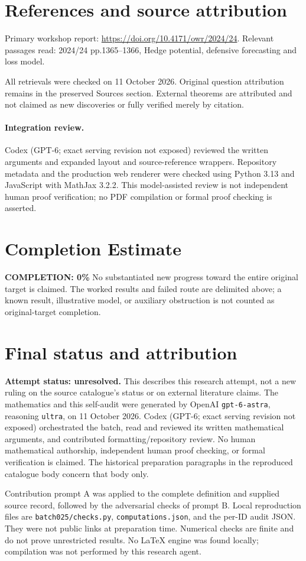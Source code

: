 \documentclass[11pt]{article}
\begin{document}
\section{References and source attribution}
Primary workshop report: \url{https://doi.org/10.4171/owr/2024/24}. Relevant passages read: 2024/24 pp.1365--1366, Hedge potential, defensive forecasting and loss model.

All retrievals were checked on 11 October 2026. Original question attribution remains in the preserved Sources section. External theorems are attributed and not claimed as new discoveries or fully verified merely by citation.


\paragraph{Integration review.} Codex (GPT-6; exact serving revision not exposed) reviewed the written arguments and expanded layout and source-reference wrappers. Repository metadata and the production web renderer were checked using Python 3.13 and JavaScript with MathJax 3.2.2. This model-assisted review is not independent human proof verification; no PDF compilation or formal proof checking is asserted.

\section{Completion Estimate}
\noindent\textbf{COMPLETION: 0\%}
No substantiated new progress toward the entire original target is claimed. The worked results and failed route are delimited above; a known result, illustrative model, or auxiliary obstruction is not counted as original-target completion.

\section{Final status and attribution}
\textbf{Attempt status: unresolved.} This describes this research attempt, not a new ruling on the source catalogue's status or on external literature claims.
The mathematics and this self-audit were generated by OpenAI \texttt{gpt-6-astra}, reasoning \texttt{ultra}, on 11 October 2026. Codex (GPT-6; exact serving revision not exposed) orchestrated the batch, read and reviewed its written mathematical arguments, and contributed formatting/repository review. No human mathematical authorship, independent human proof checking, or formal verification is claimed. The historical preparation paragraphs in the reproduced catalogue body concern that body only.

Contribution prompt A was applied to the complete definition and supplied source record, followed by the adversarial checks of prompt B. Local reproduction files are \texttt{batch025/checks.py}, \texttt{computations.json}, and the per-ID audit JSON. They were not public links at preparation time. Numerical checks are finite and do not prove unrestricted results. No LaTeX engine was found locally; compilation was not performed by this research agent.
\end{document}
